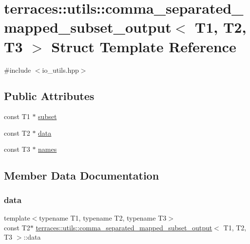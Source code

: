 \hypertarget{structterraces_1_1utils_1_1comma__separated__mapped__subset__output}{}\section{terraces\+:\+:utils\+:\+:comma\+\_\+separated\+\_\+mapped\+\_\+subset\+\_\+output$<$ T1, T2, T3 $>$ Struct Template Reference}
\label{structterraces_1_1utils_1_1comma__separated__mapped__subset__output}


{\ttfamily \#include $<$io\+\_\+utils.\+hpp$>$}

\subsection*{Public Attributes}
\begin{DoxyCompactItemize}
\item 
const T1 $\ast$ \hyperlink{structterraces_1_1utils_1_1comma__separated__mapped__subset__output_afd315f58b3f2b706b70d0f5fc6f14379}{subset}
\item 
const T2 $\ast$ \hyperlink{structterraces_1_1utils_1_1comma__separated__mapped__subset__output_ad5c20badf4d5927ea3cde71171632933}{data}
\item 
const T3 $\ast$ \hyperlink{structterraces_1_1utils_1_1comma__separated__mapped__subset__output_ab2de71ea78fdb15303085ae9c0d3002a}{names}
\end{DoxyCompactItemize}


\subsection{Member Data Documentation}
\mbox{\label{structterraces_1_1utils_1_1comma__separated__mapped__subset__output_ad5c20badf4d5927ea3cde71171632933}} 
\subsubsection{\texorpdfstring{data}{data}}
{\footnotesize\ttfamily template$<$typename T1, typename T2, typename T3$>$ \\
const T2$\ast$ \hyperlink{structterraces_1_1utils_1_1comma__separated__mapped__subset__output}{terraces\+::utils\+::comma\+\_\+separated\+\_\+mapped\+\_\+subset\+\_\+output}$<$ T1, T2, T3 $>$\+::data}

